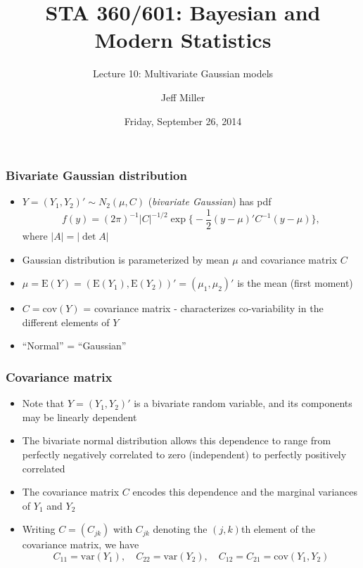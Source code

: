 \documentclass[handout]{beamer}
\title{STA 360/601: Bayesian and Modern Statistics}
\subtitle{Lecture 10: Multivariate Gaussian models}
\author{Jeff Miller}
\institute{Department of Statistical Science, Duke University}
\date{Friday, September 26, 2014}
\begin{document}
\frame{\titlepage}




\begin{frame}
\frametitle{Bivariate Gaussian distribution}
\begin{itemize}[<+-| alert@+>]
    \item $Y = (Y_1,Y_2)' \sim N_2( \mu, C)$ ({\em bivariate Gaussian}) has pdf
$$f(y) = (2\pi)^{-1}|C |^{-1/2} \exp\bigg\{ -\frac{1}{2} (y - \mu)'C^{-1}(y - \mu) \bigg\},$$
where $| A | = |\det A|$

\item Gaussian distribution is parameterized by mean $\mu$ and covariance matrix $C$

\item $\mu = \mbox{E}( Y ) = (\mbox{E}(Y_1), \mbox{E}(Y_2))' = (\mu_1,\mu_2)' $ is the mean (first moment) 

\item $C = \mbox{cov}( Y )$ = covariance matrix - characterizes co-variability in the different elements of $Y$

\item ``Normal'' = ``Gaussian''
\end{itemize}
\end{frame}

\begin{frame}
\frametitle{Covariance matrix}
\begin{itemize}[<+-| alert@+>]
    \item Note that $Y=(Y_1,Y_2)'$ is a bivariate random variable, and its components may be linearly dependent

\item The bivariate normal distribution allows this dependence to range from perfectly negatively correlated to zero
(independent) to perfectly positively correlated

\item The covariance matrix $C$ encodes this dependence and the marginal variances of $Y_1$ and $Y_2$

\item Writing $C = ( C_{jk} )$ with $C_{jk}$ denoting the $(j,k)$th element of the covariance matrix, we have
$$C_{11} = \mbox{var}( Y_1 ),\quad C_{22} = \mbox{var}( Y_2 ),\quad 
C_{12}=C_{21} = \mbox{cov}( Y_1,Y_2)$$
\end{itemize}
\end{frame}
\end{document}
